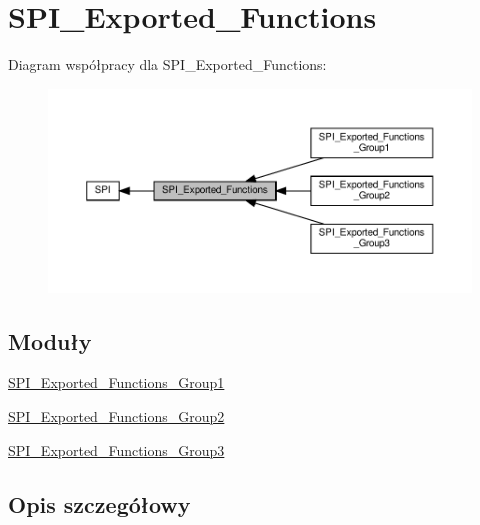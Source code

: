 \hypertarget{group___s_p_i___exported___functions}{}\section{S\+P\+I\+\_\+\+Exported\+\_\+\+Functions}
\label{group___s_p_i___exported___functions}
Diagram współpracy dla S\+P\+I\+\_\+\+Exported\+\_\+\+Functions\+:\nopagebreak
\begin{figure}[H]
\begin{center}
\leavevmode
\includegraphics[width=350pt]{group___s_p_i___exported___functions}
\end{center}
\end{figure}
\subsection*{Moduły}
\begin{DoxyCompactItemize}
\item 
\hyperlink{group___s_p_i___exported___functions___group1}{S\+P\+I\+\_\+\+Exported\+\_\+\+Functions\+\_\+\+Group1}
\item 
\hyperlink{group___s_p_i___exported___functions___group2}{S\+P\+I\+\_\+\+Exported\+\_\+\+Functions\+\_\+\+Group2}
\item 
\hyperlink{group___s_p_i___exported___functions___group3}{S\+P\+I\+\_\+\+Exported\+\_\+\+Functions\+\_\+\+Group3}
\end{DoxyCompactItemize}


\subsection{Opis szczegółowy}
